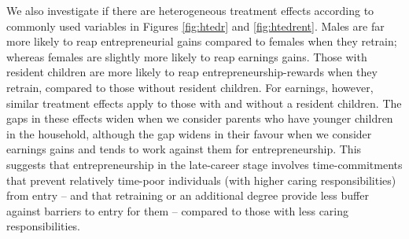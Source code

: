 \documentclass[12pt, a4paper]{article}
\begin{document}
We also investigate if there are heterogeneous treatment effects according to
commonly used variables in Figures \ref{fig:htedr} and \ref{fig:htedrent}. Males are far more likely to reap entrepreneurial gains compared to females when they retrain; whereas females are slightly more likely to reap earnings gains.
Those with resident children are more likely to reap entrepreneurship-rewards when they retrain, compared to those without resident children. For earnings, however, similar treatment effects apply to those with and without a resident children. The gaps in these effects widen when we consider parents who have younger children in the household, although the gap widens in their favour when we consider earnings gains and tends to work against them for entrepreneurship. This suggests that entrepreneurship in the late-career stage involves time-commitments that prevent relatively time-poor individuals (with higher caring responsibilities) from entry -- and that retraining or an additional degree provide less buffer against barriers to entry for them -- compared to those with less caring responsibilities.
%
\
%
\end{document}
